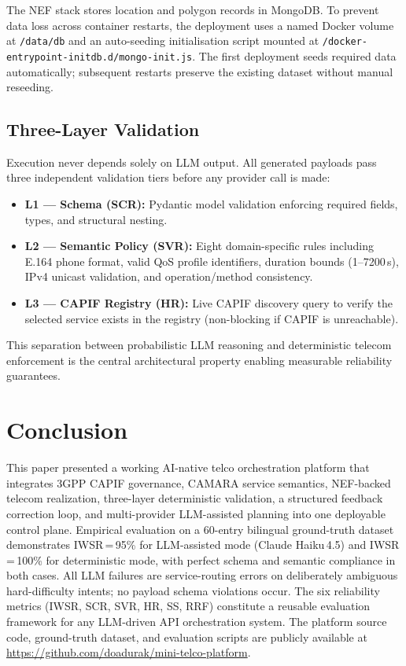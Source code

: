 \documentclass[conference]{IEEEtran}
\begin{document}
The NEF stack stores location and polygon records in MongoDB. To prevent
data loss across container restarts, the deployment uses a named Docker
volume at \texttt{/data/db} and an auto-seeding initialisation script
mounted at \texttt{/docker-entrypoint-initdb.d/mongo-init.js}.
The first deployment seeds required data automatically; subsequent restarts
preserve the existing dataset without manual reseeding.

\subsection{Three-Layer Validation}

Execution never depends solely on LLM output. All generated payloads pass
three independent validation tiers before any provider call is made:

\begin{itemize}[leftmargin=1.1em]
  \item \textbf{L1 — Schema (SCR):} Pydantic model validation enforcing
        required fields, types, and structural nesting.
  \item \textbf{L2 — Semantic Policy (SVR):} Eight domain-specific rules
        including E.164 phone format, valid QoS profile identifiers,
        duration bounds (1--7200\,s), IPv4 unicast validation, and
        operation/method consistency.
  \item \textbf{L3 — CAPIF Registry (HR):} Live CAPIF discovery query
        to verify the selected service exists in the registry
        (non-blocking if CAPIF is unreachable).
\end{itemize}

This separation between probabilistic LLM reasoning and deterministic
telecom enforcement is the central architectural property enabling
measurable reliability guarantees.

\section{Conclusion}

This paper presented a working AI-native telco orchestration platform that
integrates 3GPP CAPIF governance, CAMARA service semantics, NEF-backed
telecom realization, three-layer deterministic validation, a structured
feedback correction loop, and multi-provider LLM-assisted planning into one
deployable control plane.
Empirical evaluation on a 60-entry bilingual ground-truth dataset demonstrates
IWSR\,=\,95\% for LLM-assisted mode (Claude Haiku\,4.5) and IWSR\,=\,100\%
for deterministic mode, with perfect schema and semantic compliance in both
cases.
All LLM failures are service-routing errors on deliberately ambiguous
hard-difficulty intents; no payload schema violations occur.
The six reliability metrics (IWSR, SCR, SVR, HR, SS, RRF) constitute a
reusable evaluation framework for any LLM-driven API orchestration system.
The platform source code, ground-truth dataset, and evaluation scripts
are publicly available at
\url{https://github.com/doadurak/mini-telco-platform}.
\end{document}
